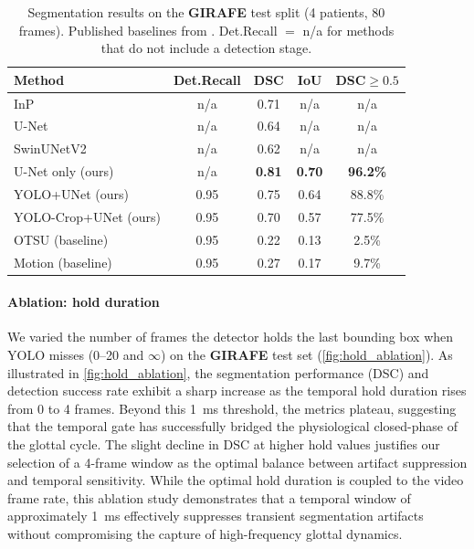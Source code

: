 \documentclass[preprint,12pt]{elsarticle}
\newcommand{\girafe}{\textbf{GIRAFE}}
\newcommand{\yolounet}{YOLO+UNet}
\newcommand{\yolocrop}{YOLO-Crop+UNet}
\begin{document}
\begin{table}[t]
\centering
\caption{Segmentation results on the \girafe{} test split (4 patients,
  80 frames). Published baselines from \protect\cite{andrade2025datainbrief}.
  Det.Recall $=$ n/a for methods that do not include a detection stage.}
\label{tab:girafe}
\small
\setlength{\tabcolsep}{4pt}
\begin{tabular}{lcccc}
\toprule
Method & Det.Recall & DSC & IoU & DSC${\geq}0.5$ \\
\midrule
InP~\cite{andrade2025datainbrief}       & n/a   & 0.71 & n/a   & n/a \\
U-Net~\cite{andrade2025datainbrief}     & n/a   & 0.64 & n/a   & n/a \\
SwinUNetV2~\cite{andrade2025datainbrief}& n/a   & 0.62 & n/a   & n/a \\
\midrule
U-Net only (ours)                       & n/a   & \textbf{0.81} & \textbf{0.70} & \textbf{96.2\%} \\
\yolounet{} (ours)                      & 0.95 & 0.75 & 0.64 & 88.8\% \\
\yolocrop{} (ours)                      & 0.95 & 0.70 & 0.57 & 77.5\% \\
\midrule
OTSU (baseline)                         & 0.95 & 0.22 & 0.13 &  2.5\% \\
Motion (baseline)                       & 0.95 & 0.27 & 0.17 &  9.7\% \\
\bottomrule
\end{tabular}
\end{table}

\paragraph{Ablation: hold duration}
We varied the number of frames the detector holds the last bounding box when
YOLO misses (0--20 and $\infty$) on the \girafe{} test set (\cref{fig:hold_ablation}).
As illustrated in \cref{fig:hold_ablation}, the segmentation performance
(DSC) and detection success rate exhibit a sharp increase as the temporal
hold duration rises from 0 to 4 frames.
Beyond this \SI{1}{ms} threshold, the metrics plateau, suggesting that the
temporal gate has successfully bridged the physiological closed-phase of
the glottal cycle.
The slight decline in DSC at higher hold values justifies our selection of
a 4-frame window as the optimal balance between artifact suppression and
temporal sensitivity.
While the optimal hold duration is coupled to the video frame rate, this
ablation study demonstrates that a temporal window of approximately
\SI{1}{ms} effectively suppresses transient segmentation artifacts without
compromising the capture of high-frequency glottal dynamics.
\end{document}

